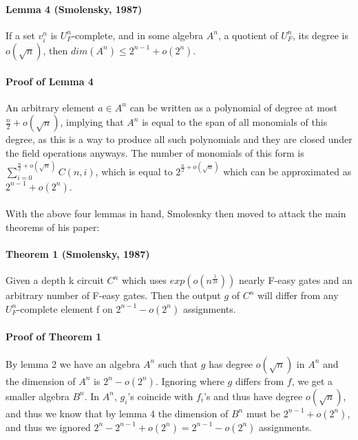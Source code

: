 \documentclass{article}
\begin{document}
\paragraph*{Lemma 4 (Smolensky, 1987)}
  If a set $v_i^n$ is $U_F^n$-complete, and in some algebra $A^n$, a quotient of $U_F^n$, its degree
is $o(\sqrt{n})$, then $dim(A^n) \leq 2^{n-1} + o(2^n)$.

\paragraph*{Proof of Lemma 4 \cite{Smolensky1987}}
  An arbitrary element $a \in A^n$ can be written as a polynomial of degree at most $\frac{n}{2} +
o(\sqrt{n})$, implying that $A^n$ is equal to the span of all monomials of this degree, as this is
a way to produce all such polynomials and they are closed under the field operations anyways. 
The number of monomials of this form is $\sum_{i = 0}^{\frac{n}{2} + o(\sqrt{n})} C(n, i)$, which
is equal to $2^{\frac{n}{2} + o(\sqrt{n})}$ which can be approximated as $2^{n-1} + o(2^n)$.

\paragraph*{}
  With the above four lemmas in hand, Smolesnky then moved to attack the main theorems of his paper:

\paragraph*{Theorem 1 (Smolensky, 1987)}
  Given a depth k circuit $C^n$ which uses $exp(o(n^{\frac{1}{2k}}))$ nearly F-easy gates and an
arbitrary number of F-easy gates. Then the output $g$ of $C^n$ will differ from any $U_F^n$-complete
element f on $2^{n-1} - o(2^n)$ assignments.

\paragraph*{Proof of Theorem 1 \cite{Smolensky1987}}
  By lemma 2 we have an algebra $A^n$ such that $g$ has degree $o(\sqrt{n})$ in $A^n$ and the
dimension of $A^n$ is $2^n - o(2^n)$. Ignoring where $g$ differs from $f$, we get a smaller
algebra $B^n$. In $A^n$, $g_i$'s coincide with $f_i$'s and thus have degree $o(\sqrt{n})$, and
thus we know that by lemma 4 the dimension of $B^n$ must be $2^{n-1} + o(2^n)$, and thus we
ignored $2^n - 2^{n-1} + o(2^n) = 2^{n-1} - o(2^n)$ assignments.
\end{document}
